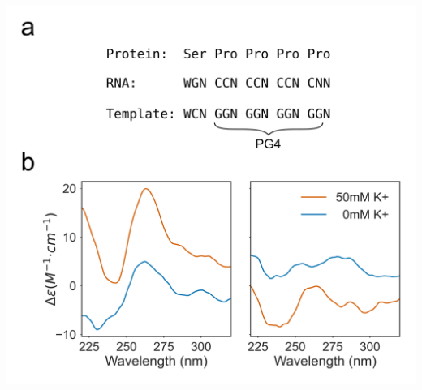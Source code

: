 \documentclass[12pt,a4paper,]{report}
\let\origfigure=\figure
\let\endorigfigure=\endfigure
\renewenvironment{figure}[1][2] {
    \expandafter\origfigure\expandafter[H]
} {
    \endorigfigure
}
\begin{document}
\newpage

\begin{figure}[htbp]
\centering
\includegraphics[width=\textwidth,height=562pt,keepaspectratio]{chapter_6/figures/cd_spectroscopy1.png}
\caption[The Extensin SP4 motif forms a G-Quadruplex \textit{in vitro}.]{\textbf{The   Extensin   SP4   motif   forms   a   G-Quadruplex   \textit{in   vitro} .}   \textbf{a)}   Schematic   showing   how   the   Extensin   SP4   protein   motif   hardcodes   a   two   tetrad   PG4   into   the   template   strand   of   the   gene   body.   \textbf{b)}   CD   spectroscopy   of   an   Extensin   repeat   sequence   (left)   and   a   mutated   control   which   does   not   conform   the   the   Quadparser   motif   (right)   show   that   the   Extensin   repeat   forms   a   G4   \textit{in   vitro} .   This   is   indicated   by   the   peak   in   ellipticity   at   260nm   and   the   trough   at   240nm,   which   are   characteristic   of   a   parallel   G4.   \label{cd_spec}}
\end{figure}
\end{document}
